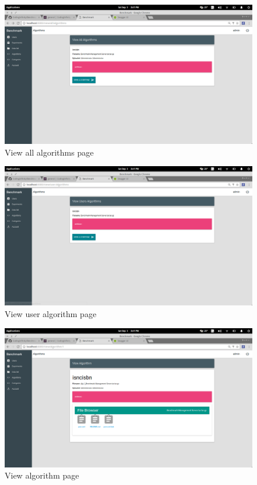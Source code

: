 \documentclass[11pt,a4paper]{article}
\begin{document}
\begin{figure}[H]
	\begin{center}
		\includegraphics[scale=0.3]{../Images/User Manual/View Algorithms.png}
		\caption{View all algorithms page}
		\label{fig:viewAllAlg}
	\end{center}  
\end{figure}
\begin{figure}[H]
	\begin{center}
		\includegraphics[scale=0.3]{../Images/User Manual/View User Algorithms.png}
		\caption{View user algorithm page}
		\label{fig:viewUserAlg}
	\end{center}  
\end{figure}
\begin{figure}[H]
	\begin{center}
		\includegraphics[scale=0.3]{../Images/User Manual/View Algorithm.png}
		\caption{View algorithm page}
		\label{fig:viewAlg}
	\end{center}  
\end{figure}
\end{document}
